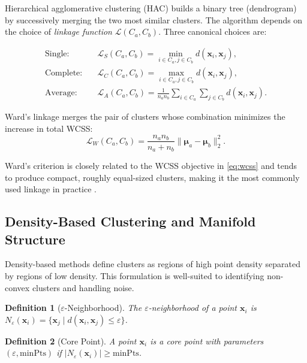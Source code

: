 \documentclass[conference]{IEEEtran}
\newtheorem{definition}{Definition}
\begin{document}
Hierarchical agglomerative clustering (HAC) builds a binary tree (dendrogram) by successively merging the two most similar clusters. The algorithm depends on the choice of \emph{linkage function} $\mathcal{L}(C_a, C_b)$. Three canonical choices are:

\begin{align}
\text{Single:} & \quad \mathcal{L}_S(C_a, C_b) = \min_{i \in C_a, j \in C_b} d(\mathbf{x}_i, \mathbf{x}_j), \label{eq:single}\\
\text{Complete:} & \quad \mathcal{L}_C(C_a, C_b) = \max_{i \in C_a, j \in C_b} d(\mathbf{x}_i, \mathbf{x}_j), \label{eq:complete}\\
\text{Average:} & \quad \mathcal{L}_A(C_a, C_b) = \frac{1}{n_a n_b}\sum_{i \in C_a}\sum_{j \in C_b} d(\mathbf{x}_i, \mathbf{x}_j). \label{eq:average}
\end{align}

Ward's linkage \cite{ward1963hierarchical} merges the pair of clusters whose combination minimizes the increase in total WCSS:
\begin{equation}
\mathcal{L}_W(C_a, C_b) = \frac{n_a n_b}{n_a + n_b}\|\boldsymbol{\mu}_a - \boldsymbol{\mu}_b\|_2^2.
\label{eq:ward}
\end{equation}

Ward's criterion is closely related to the WCSS objective in \eqref{eq:wcss} and tends to produce compact, roughly equal-sized clusters, making it the most commonly used linkage in practice \cite{mullner2011modern}.

\subsection{Density-Based Clustering and Manifold Structure}

Density-based methods define clusters as regions of high point density separated by regions of low density. This formulation is well-suited to identifying non-convex clusters and handling noise.

\begin{definition}[$\varepsilon$-Neighborhood]
The $\varepsilon$-neighborhood of a point $\mathbf{x}_i$ is $N_\varepsilon(\mathbf{x}_i) = \{\mathbf{x}_j \mid d(\mathbf{x}_i, \mathbf{x}_j) \leq \varepsilon\}$.
\end{definition}

\begin{definition}[Core Point]
A point $\mathbf{x}_i$ is a \emph{core point} with parameters $(\varepsilon, \mathrm{minPts})$ if $|N_\varepsilon(\mathbf{x}_i)| \geq \mathrm{minPts}$.
\end{definition}
\end{document}
